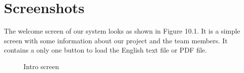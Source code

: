 \documentclass[oneside,a4paper,12pt]{book}
\begin{document}
\section{Screenshots}
The welcome screen of our system looks as shown in Figure 10.1. It is a simple screen with some information about our project and the team members. It contains a only one button to load the English text file or PDF file.
 \begin{center}
 	\begin{figure}[!htbp]
 		\centering
 		\caption{Intro screen}
 		\label{fig:intro-screen}
 	\end{figure}
 \end{center} 
\end{document}
